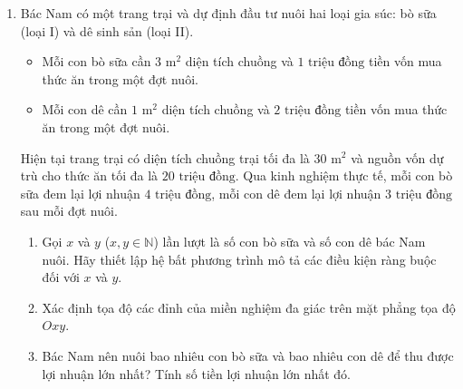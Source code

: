 \documentclass[12pt,a4paper]{article}
\begin{document}
\begin{enumerate}
\begin{minipage}[t]{0.40\linewidth}
\end{minipage}

\item Bác Nam có một trang trại và dự định đầu tư nuôi hai loại gia súc: bò sữa (loại I) và dê sinh sản (loại II).
\begin{itemize}[leftmargin=0.6cm, itemsep=1.5pt]
    \item Mỗi con bò sữa cần $3\text{ m}^2$ diện tích chuồng và $1\text{ triệu đồng}$ tiền vốn mua thức ăn trong một đợt nuôi.
    \item Mỗi con dê cần $1\text{ m}^2$ diện tích chuồng và $2\text{ triệu đồng}$ tiền vốn mua thức ăn trong một đợt nuôi.
\end{itemize}
Hiện tại trang trại có diện tích chuồng trại tối đa là $30\text{ m}^2$ và nguồn vốn dự trù cho thức ăn tối đa là $20\text{ triệu đồng}$. Qua kinh nghiệm thực tế, mỗi con bò sữa đem lại lợi nhuận $4\text{ triệu đồng}$, mỗi con dê đem lại lợi nhuận $3\text{ triệu đồng}$ sau mỗi đợt nuôi.
\begin{enumerate}
    \item Gọi $x$ và $y$ ($x, y \in \mathbb{N}$) lần lượt là số con bò sữa và số con dê bác Nam nuôi. Hãy thiết lập hệ bất phương trình mô tả các điều kiện ràng buộc đối với $x$ và $y$.
    \item Xác định tọa độ các đỉnh của miền nghiệm đa giác trên mặt phẳng tọa độ $Oxy$.
    \item Bác Nam nên nuôi bao nhiêu con bò sữa và bao nhiêu con dê để thu được lợi nhuận lớn nhất? Tính số tiền lợi nhuận lớn nhất đó.
\end{enumerate}
\end{enumerate}
\end{document}
